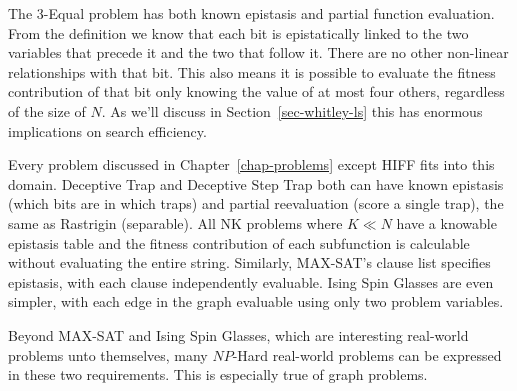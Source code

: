 The 3-Equal problem has both known epistasis and partial function evaluation. From the definition
we know that each bit is epistatically linked to the two variables that precede it and the two
that follow it. There are no other non-linear relationships with that bit. This also means
it is possible to evaluate the fitness contribution of that bit only knowing the value of at
most four others, regardless of the size of $N$. As we'll discuss in Section~\ref{sec-whitley-ls}
this has enormous implications on search efficiency.

Every problem discussed in Chapter~\ref{chap-problems} except HIFF fits into this domain. Deceptive
Trap and Deceptive Step Trap both can have known epistasis (which bits are in which traps) and
partial reevaluation (score a single trap), the same as Rastrigin (separable). All NK problems
where $K \ll N $ have a knowable epistasis table and the fitness contribution of each subfunction is
calculable without evaluating the entire string. Similarly, MAX-SAT's clause list specifies epistasis,
with each clause independently evaluable. Ising Spin Glasses are even simpler, with each edge in the
graph evaluable using only two problem variables.

Beyond MAX-SAT and Ising Spin Glasses, which are interesting real-world problems unto themselves,
many $NP$-Hard real-world problems can be expressed in these two requirements. This is especially true
of graph problems.

